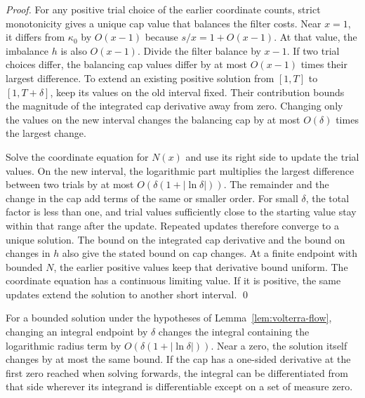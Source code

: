 \documentclass[runningheads,envcountsame,envcountsect,orivec]{llncs}
\begin{document}
\begin{proof}
For any positive trial choice of the earlier coordinate counts,
strict monotonicity gives a unique cap value that balances the
filter costs. Near $x=1$, it differs from $\kappa_0$ by
$O(x-1)$ because $s/x=1+O(x-1)$. At that value, the imbalance
$h$ is also $O(x-1)$. Divide the filter balance by $x-1$.
If two trial choices differ, the balancing cap values differ by
at most $O(x-1)$ times their largest difference.
To extend an existing positive solution from $[1,T]$ to
$[1,T+\delta]$, keep its values on the old interval fixed.
Their contribution bounds the magnitude of the integrated cap
derivative away from zero. Changing only the values on the new
interval changes the balancing cap by at most $O(\delta)$
times the largest change.

Solve the coordinate equation for $N(x)$ and use its right side
to update the trial values. On the new interval, the logarithmic
part multiplies the largest difference between two trials by at
most $O(\delta(1+|\ln\delta|))$. The remainder and the change
in the cap add terms of the same or smaller order. For small
$\delta$, the total factor is less than one, and trial values
sufficiently close to the starting value stay within that range
after the update. Repeated updates therefore converge to a unique
solution. The bound on the integrated cap derivative and the
bound on changes in $h$ also give the stated bound on cap changes.
At a finite endpoint with bounded $N$, the earlier positive values
keep that derivative bound uniform. The coordinate equation has
a continuous limiting value. If it is positive, the same updates
extend the solution to another short interval.
\qed
\end{proof}

\begin{lemma}
\label{lem:schedule-zero-regularity}
For a bounded solution under the hypotheses of
Lemma~\ref{lem:volterra-flow}, changing an integral endpoint
by $\delta$ changes the integral containing the logarithmic
radius term by $O(\delta(1+|\ln\delta|))$. Near a zero,
the solution itself changes by at most the same bound.
If the cap has a one-sided derivative at the first zero reached
when solving forwards, the integral can be differentiated from
that side wherever its integrand is differentiable except on
a set of measure zero.
\end{lemma}
\end{document}
